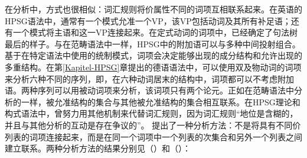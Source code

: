 在\hpsgc 分析\indexhpsgc 中，方式也很相似：词汇规则将价属性不同的词项互相联系起来。在英语的HPSG语法中，通常有一个模式允准一个VP，该VP包括动词及其所有补足语；还有一个模式将主语和这一VP连接起来\citep[]{ps2}。在定式动词的词项中，已经确定了句法树最后的样子。与在范畴语法中一样，HPSG中的附加语可以与多种中间投射组合。基于在特定语法中使用的统制模式，词项会决定能够出现的成分结构和允许出现的多重结构。在第\ref{Kapitel-HPSG}章提出的德语语法中，可以使用双及物动词的词项来分析六种不同的序列，即，在六种动词居末的结构中，词项都可以不考虑附加语。两种序列可以用被动词项来分析，该词项只有两个论元。正如在范畴语法中分析的一样，被允准结构的集合与其他被允准结构的集合相互联系。在HPSG理论和构式语法中，曾努力用其他机制来代替词汇规则，因为词汇规则“地位是含糊的，并且与其他分析的互动是存在争议的”\citep*[]{BMS2001a}。 \citet{BMS2001a} 提出了一种分析方法：不是将具有不同价列表的词项连接起来，而是在同一个词项中一个列表的次集合和另外一个列表之间建立联系。两种分析方法的结果分别见（）和（）：
